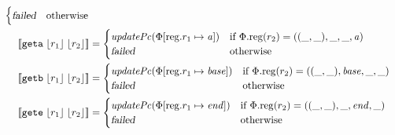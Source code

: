 \documentclass[a4paper]{article}
\newcommand{\update}[2]{[#1 \mapsto #2]}
\newcommand{\sem}[1]{\left\llbracket #1 \right\rrbracket}
\newcommand{\var}[1]{\mathit{#1}}
\newcommand{\addr}{\var{a}}
\newcommand{\start}{\var{base}}
\newcommand{\addrend}{\var{end}}
\newcommand{\plainproj}[1]{\mathrm{#1}}
\newcommand{\memreg}[1][\Phi]{#1.\plainproj{reg}}
\newcommand{\updateReg}[3][\Phi]{#1\update{\plainproj{reg}.#2}{#3}}
\newcommand{\failed}{\textsl{failed}}
\newcommand{\plainfun}[2]{
  \ifthenelse{\equal{#2}{}}
  {\mathit{#1}}
  {\mathit{#1}(#2)}
}
\newcommand{\stdUpdatePc}[1]{\plainfun{updatePc}{#1}}
\newcommand{\refreg}[1]{\lfloor #1 \rfloor}
\newcommand{\zinstr}[1]{\mathtt{#1}}
\newcommand{\twoinstr}[3]{\zinstr{#1} \; #2 \; #3}
\newcommand{\geta}[2]{\twoinstr{geta}{#1}{#2}}
\newcommand{\getb}[2]{\twoinstr{getb}{#1}{#2}}
\newcommand{\gete}[2]{\twoinstr{gete}{#1}{#2}}
\begin{document}
\begin{align*}
\begin{cases}
                                              \failed & \text{otherwise}
                                            \end{cases}
  \\
  \sem{\geta{\refreg{r_1}}{\refreg{r_2}}} & = 
                                            \begin{cases}
                                              \stdUpdatePc{\updateReg{r_1}{\addr}} &
                                              \arraycolsep=0pt
                                              \begin{array}[t]{l}
                                                \text{if $\memreg(r_2) = ((\_,\_),\_,\_,\addr)$}
                                              \end{array} \\
                                              \failed & \text{otherwise}
                                            \end{cases}
  \\
  \sem{\getb{\refreg{r_1}}{\refreg{r_2}}} & = 
                                            \begin{cases}
                                              \stdUpdatePc{\updateReg{r_1}{\start}} &
                                              \arraycolsep=0pt
                                              \begin{array}[t]{l}
                                                \text{if $\memreg(r_2) = ((\_,\_),\start,\_,\_)$}
                                              \end{array} \\
                                              \failed & \text{otherwise}
                                            \end{cases}
  \\
  \sem{\gete{\refreg{r_1}}{\refreg{r_2}}} & = 
                                            \begin{cases}
                                              \stdUpdatePc{\updateReg{r_1}{\addrend}} &
                                              \arraycolsep=0pt
                                              \begin{array}[t]{l}
                                                \text{if $\memreg(r_2) = ((\_,\_),\_,\addrend,\_)$}
                                              \end{array} \\
                                              \failed & \text{otherwise}

\end{cases}
\end{align*}
\end{document}
